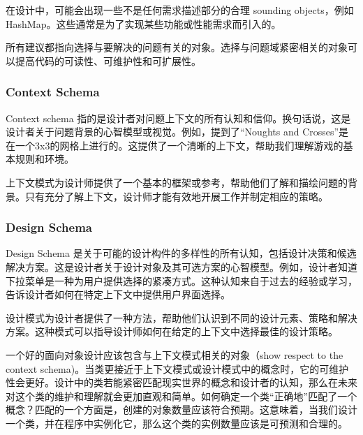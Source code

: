 在设计中，可能会出现一些不是任何需求描述部分的合理 sounding objects，例如HashMap。这些通常是为了实现某些功能或性能需求而引入的。

所有建议都指向选择与要解决的问题有关的对象。选择与问题域紧密相关的对象可以提高代码的可读性、可维护性和可扩展性。

\subsubsection{Context Schema}
Context schema 指的是设计者对问题上下文的所有认知和信仰。换句话说，这是设计者关于问题背景的心智模型或视觉。例如，提到了“Noughts and Crosses”是在一个3x3的网格上进行的。这提供了一个清晰的上下文，帮助我们理解游戏的基本规则和环境。

上下文模式为设计师提供了一个基本的框架或参考，帮助他们了解和描绘问题的背景。只有充分了解上下文，设计师才能有效地开展工作并制定相应的策略。
\subsubsection{Design Schema}
Design Schema 是关于可能的设计构件的多样性的所有认知，包括设计决策和候选解决方案。这是设计者关于设计对象及其可选方案的心智模型。例如，设计者知道下拉菜单是一种为用户提供选择的紧凑方式。这种认知来自于过去的经验或学习，告诉设计者如何在特定上下文中提供用户界面选择。

设计模式为设计者提供了一种方法，帮助他们认识到不同的设计元素、策略和解决方案。这种模式可以指导设计师如何在给定的上下文中选择最佳的设计策略。

一个好的面向对象设计应该包含与上下文模式相关的对象（show respect to the context schema)。当类更接近于上下文模式或设计模式中的概念时，它的可维护性会更好。设计中的类若能紧密匹配现实世界的概念和设计者的认知，那么在未来对这个类的维护和理解就会更加直观和简单。如何确定一个类“正确地”匹配了一个概念？匹配的一个方面是，创建的对象数量应该符合预期。这意味着，当我们设计一个类，并在程序中实例化它，那么这个类的实例数量应该是可预测和合理的。